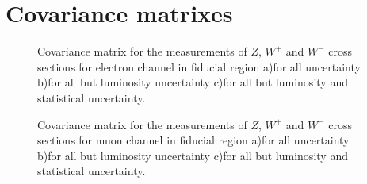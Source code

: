 \chapter{Covariance matrixes}\label{app:Cor}

\begin{figure}[!h]
\begin{minipage}[h]{0.32\linewidth}
\end{minipage}
\hfill
\begin{minipage}[h]{0.32\linewidth}
\end{minipage}
\hfill
\begin{minipage}[h]{0.32\linewidth}
\end{minipage}
\caption{Covariance matrix for the measurements of $Z$, $W^+$ and $W^{-}$  cross sections for electron channel in fiducial region a)for all uncertainty b)for all but luminosity uncertainty c)for all but luminosity and statistical uncertainty. }
\end{figure}

\begin{figure}[!h]
\begin{minipage}[h]{0.32\linewidth}
\end{minipage}
\hfill
\begin{minipage}[h]{0.32\linewidth}
\end{minipage}
\hfill
\begin{minipage}[h]{0.32\linewidth}
\end{minipage}
\caption{Covariance matrix for the measurements of $Z$, $W^+$ and $W^{-}$  cross sections for muon channel in fiducial region a)for all uncertainty b)for all but luminosity uncertainty c)for all but luminosity and statistical uncertainty. }
\end{figure}


